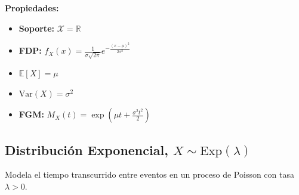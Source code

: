 \vspace{0.8em}
\noindent
\begin{minipage}[c]{0.45\textwidth}
    \textbf{Propiedades:}
    \begin{itemize}\setlength\itemsep{0.3em}
        \item \textbf{Soporte:} $\mathcal{X} = \mathbb{R}$
        \item \textbf{FDP:} $f_X(x) = \frac{1}{\sigma \sqrt{2\pi}} e^{-\frac{(x-\mu)^2}{2\sigma^2}}$
        \item $\mathbb{E}[X] = \mu$
        \item $\text{Var}(X) = \sigma^2$
        \item \textbf{FGM:} $M_X(t) = \exp\left( \mu t + \frac{\sigma^2 t^2}{2} \right)$
    \end{itemize}
\end{minipage}%
\hfill
\begin{minipage}[c]{0.5\textwidth}
    \begin{center}
    \end{center}
\end{minipage}

\vspace{1.5em}

\subsection*{Distribución Exponencial, $X \sim \text{Exp}(\lambda)$}
Modela el tiempo transcurrido entre eventos en un proceso de Poisson con tasa $\lambda > 0$.

